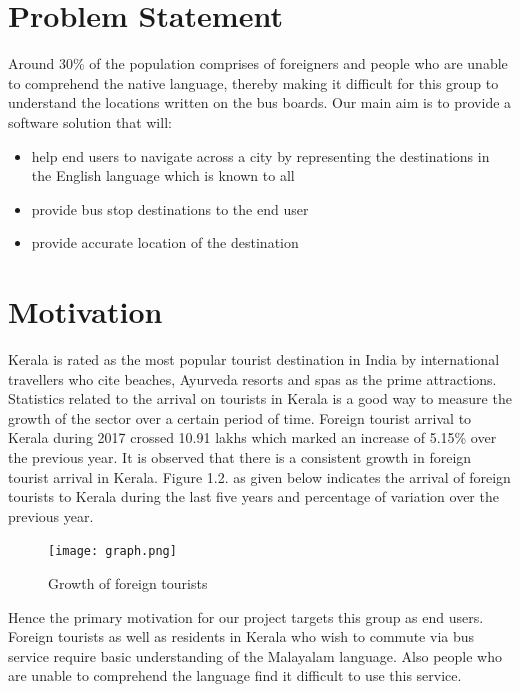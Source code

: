 \documentclass[a4paper,12pt]{report}
\begin{document}
\section{Problem Statement}
Around 30\% of the population comprises of foreigners and people who are unable to comprehend the native language, thereby making it difficult for this group to understand the locations written on the bus boards. Our main aim is to provide a software solution that will: 

\begin{itemize}
\item help end users to navigate across a city by representing the destinations in the English language which is known to all
\item provide bus stop destinations to the end user
\item provide accurate location of the destination
\end{itemize}

\section{Motivation}
Kerala is rated as the most popular tourist destination in India by international travellers who cite beaches, Ayurveda resorts and spas as the prime attractions. Statistics related to the arrival on tourists in Kerala is a good way to measure the growth of the sector over a certain period of time. Foreign tourist arrival to Kerala during 2017 crossed 10.91 lakhs which marked an increase of 5.15\% over the previous year. It is observed that there is a consistent growth in foreign tourist arrival in Kerala. Figure 1.2. as given below indicates the arrival of foreign tourists to Kerala during the last five years and percentage of variation over the previous year. 

\vspace*{0.2cm}
\begin{figure}[!h]
	\begin{center}
		\texttt{[image: graph.png]}    
		\caption{Growth of foreign tourists}
		\label{fig1}
	\end{center}
\end{figure}
\vspace*{0.5cm}

Hence the primary motivation for our project targets this group as end users. Foreign tourists as well as residents in Kerala who wish to commute via bus service require basic understanding of the Malayalam language. Also people who are unable to comprehend the language find it difficult to use this service. 
\end{document}
